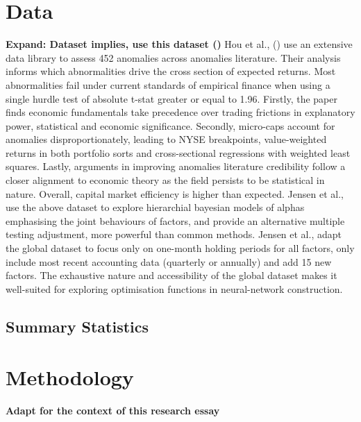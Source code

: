 \documentclass[10pt]{article}
\begin{document}
\section{Data}
\textbf{Expand: Dataset implies, use this dataset (\cite{jensen2021there})}
Hou et al., (\citeyear{hou2020replicating}) use an extensive data library to assess 452 anomalies across anomalies literature.
Their analysis informs which abnormalities drive the cross section of expected returns. 
Most abnormalities fail under current standards of empirical finance when using a single hurdle test of absolute t-stat greater or equal to 1.96.
Firstly, the paper finds economic fundamentals take precedence over trading frictions in explanatory power, statistical and economic significance.
Secondly, micro-caps account for anomalies disproportionately, leading to NYSE breakpoints, value-weighted returns in both portfolio sorts and cross-sectional regressions with weighted least squares. 
Lastly, arguments in improving anomalies literature credibility follow a closer alignment to economic theory as the field persists to be statistical in nature.
Overall, capital market efficiency is higher than expected.
Jensen et al., \citeyear{jensen2021there} use the above dataset to explore hierarchial bayesian models of alphas emphasising the joint behaviours of factors, 
and provide an alternative multiple testing adjustment, more powerful than common methods.
Jensen et al., adapt the global dataset to focus only on one-month holding periods for all factors, only include most recent accounting data (quarterly or annually) and add 15 new factors.
The exhaustive nature and accessibility of the global dataset makes it well-suited for exploring optimisation functions in neural-network construction.
\subsection{Summary Statistics}
\section{Methodology}
\textbf{Adapt for the context of this research essay}
\end{document}
